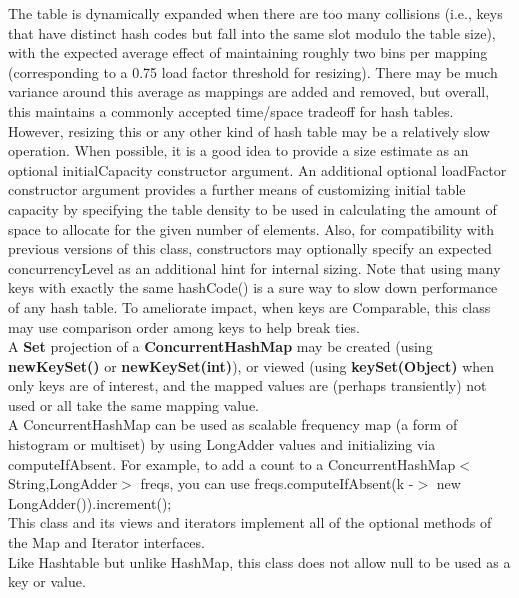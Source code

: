 \documentclass[UTF8,11pt]{ctexbook}
\newcommand{\bold}[1]{\textbf{#1}}
\begin{document}
	The table is dynamically expanded when there are too many collisions (i.e., keys that have distinct hash codes but fall into the same slot modulo the table size), with the expected average effect of maintaining roughly two bins per mapping (corresponding to a 0.75 load factor threshold for resizing). There may be much variance around this average as mappings are added and removed, but overall, this maintains a commonly accepted time/space tradeoff for hash tables. However, resizing this or any other kind of hash table may be a relatively slow operation. When possible, it is a good idea to provide a size estimate as an optional initialCapacity constructor argument. An additional optional loadFactor constructor argument provides a further means of customizing initial table capacity by specifying the table density to be used in calculating the amount of space to allocate for the given number of elements. Also, for compatibility with previous versions of this class, constructors may optionally specify an expected concurrencyLevel as an additional hint for internal sizing. Note that using many keys with exactly the same hashCode() is a sure way to slow down performance of any hash table. To ameliorate impact, when keys are Comparable, this class may use comparison order among keys to help break ties.\\
	
	A \bold{Set} projection of a \bold{ConcurrentHashMap} may be created (using \bold{newKeySet()} or \bold{newKeySet(int)}), or viewed (using \bold{keySet(Object)} when only keys are of interest, and the mapped values are (perhaps transiently) not used or all take the same mapping value.\\
	
	A ConcurrentHashMap can be used as scalable frequency map (a form of histogram or multiset) by using LongAdder values and initializing via computeIfAbsent. For example, to add a count to a ConcurrentHashMap$<$String,LongAdder$>$ freqs, you can use freqs.computeIfAbsent(k -$>$ new LongAdder()).increment();\\
	
	This class and its views and iterators implement all of the optional methods of the Map and Iterator interfaces.\\
	
	Like Hashtable but unlike HashMap, this class does not allow null to be used as a key or value.\\
	
\end{document}
